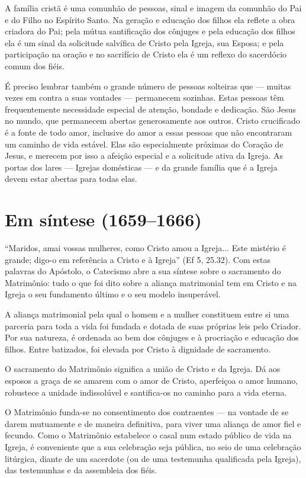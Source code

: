 A família cristã é uma comunhão de pessoas, sinal e imagem da comunhão do Pai e do Filho no Espírito Santo. Na geração e educação dos filhos ela reflete a obra criadora do Pai; pela mútua santificação dos cônjuges e pela educação dos filhos ela é um sinal da solicitude salvífica de Cristo pela Igreja, sua Esposa; e pela participação na oração e no sacrifício de Cristo ela é um reflexo do sacerdócio comum dos fiéis.

É preciso lembrar também o grande número de pessoas solteiras que --- muitas vezes em contra a suas vontades --- permanecem sozinhas. Estas pessoas têm frequentemente necessidade especial de atenção, bondade e dedicação. São Jesus no mundo, que permanecem abertas generosamente aos outros. Cristo crucificado é a fonte de todo amor, inclusive do amor a essas pessoas que não encontraram um caminho de vida estável. Elas são especialmente próximas do Coração de Jesus, e merecem por isso a afeição especial e a solicitude ativa da Igreja. As portas dos lares --- Igrejas domésticas --- e da grande família que é a Igreja devem estar abertas para todas elas.

\section{Em síntese (1659--1666)}

``Maridos, amai vossas mulheres, como Cristo amou a Igreja... Este mistério é grande; digo-o em referência a Cristo e à Igreja'' (Ef 5, 25.32). Com estas palavras do Apóstolo, o Catecismo abre a sua síntese sobre o sacramento do Matrimônio: tudo o que foi dito sobre a aliança matrimonial tem em Cristo e na Igreja o seu fundamento último e o seu modelo insuperável.

A aliança matrimonial pela qual o homem e a mulher constituem entre si uma parceria para toda a vida foi fundada e dotada de suas próprias leis pelo Criador. Por sua natureza, é ordenada ao bem dos cônjuges e à procriação e educação dos filhos. Entre batizados, foi elevada por Cristo à dignidade de sacramento.

O sacramento do Matrimônio significa a união de Cristo e da Igreja. Dá aos esposos a graça de se amarem com o amor de Cristo, aperfeiçoa o amor humano, robustece a unidade indissolúvel e santifica-os no caminho para a vida eterna.

O Matrimônio funda-se no consentimento dos contraentes --- na vontade de se darem mutuamente e de maneira definitiva, para viver uma aliança de amor fiel e fecundo. Como o Matrimônio estabelece o casal num estado público de vida na Igreja, é conveniente que a sua celebração seja pública, no seio de uma celebração litúrgica, diante de um sacerdote (ou de uma testemunha qualificada pela Igreja), das testemunhas e da assembleia dos fiéis.

